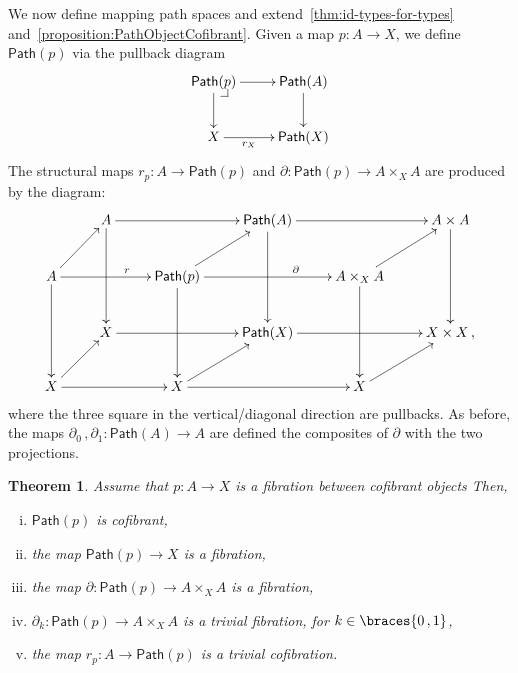 \documentclass[reqno,10pt,a4paper,oneside]{amsart}
\makeatletter
\numberwithin{equation}{section}
\theoremstyle{mythm}
\newtheorem{theorem}{Theorem}[section]
\theoremstyle{mydef}
\theoremstyle{myrmk}
\newcommand{\pullback}[1]{\save*!/#1-1.2pc/#1:(-1,1)@^{|-}\restore}
\newcommand{\drpullback}{\pullback{dr}}
\newcommand{\co}{\colon}
\DeclarePairedDelimiter\braces\lbrace\rbrace
\newcommand{\Path}{\mathsf{Path}}
\makeatother
\begin{document}
We now define mapping path spaces and  extend~\cref{thm:id-types-for-types} and~\cref{proposition:PathObjectCofibrant}. Given a map $p \co A \to X$, we define $\Path(p)$ 
via the pullback diagram
\[
\xymatrix{
\Path(p) \drpullback \ar[r] \ar[d] & \Path(A) \ar[d] \\
X \ar[r]_-{r_X} & \Path(X) }
\]
The structural maps $r_p \co A \rightarrow \Path(p)$ and $\partial \co \Path(p) \rightarrow A \times_{X} A$ are produced by the diagram:
\[
\xymatrix{
& A \ar[rr] \ar[dd] & & \Path(A) \ar[rr] \ar[dd] & & A \times A \ar[dd] \\
A \ar[ur] \ar[rr]^(.6){r}  \ar[dd] & & \Path(p) \ar[ur] \ar[rr]^(.65){\partial} \ar[dd] & & A \times_{X} A \ar[ur] \ar[dd] \\
& X \ar[rr] & & \Path(X) \ar[rr] & & X \times X \, , \\
X \ar[ur] \ar[rr] & & X \ar[rr] \ar[ur] & & X \ar[ur] \\ 
}
\]
where the three square in the vertical/diagonal direction are pullbacks. As before, the maps
$\partial_0 \, , \partial_1 \co \Path(A) \to A$ are defined the composites of $\partial$
with the two projections. 


\begin{theorem}
\label{thm:MainPathObject}
Assume that $p \co A \rightarrow X $ is a fibration between cofibrant objects Then,
\begin{enumerate}[(i)] 
\item \label{thm:MainPathObject:IdBifib} $\Path(p)$ is cofibrant, 
\item the map $\Path(p) \rightarrow X$ is a fibration,
\item the map $\partial \co \Path(p) \rightarrow A \times_{X} A$ is a fibration,
\item $\partial_k \co \Path(p) \rightarrow A \times_{X} A$  is a trivial fibration, for $k \in \braces{0 \, , 1 }$,
\item the map $r_p \co A \rightarrow \Path(p)$ is a trivial cofibration.
\end{enumerate}
\end{theorem}
\end{document}
